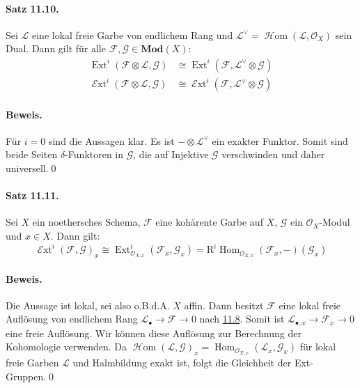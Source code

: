 \paragraph{Satz 11.10.}\label{11.10} Sei $\mathcal{L}$ eine lokal freie Garbe von endlichem Rang und $\mathcal{L}^\vee=\operatorname{\mathcal{H}om}(\mathcal{L},\mathcal{O}_X)$ sein Dual. Dann gilt für alle $\mathcal{F},\mathcal{G}\in\mathbf{Mod}(X)$:
\begin{align*}
\operatorname{Ext}^i(\mathcal{F}\otimes\mathcal{L},\mathcal{G}) &\cong \operatorname{Ext}^i(\mathcal{F},\mathcal{L}^\vee\otimes\mathcal{G})\\
\operatorname{\mathcal{E}xt}^i(\mathcal{F}\otimes\mathcal{L},\mathcal{G}) &\cong \operatorname{\mathcal{E}xt}^i(\mathcal{F},\mathcal{L}^\vee\otimes\mathcal{G})
\end{align*}

\paragraph{Beweis.} Für $i=0$ sind die Aussagen klar. Es ist $-\otimes\mathcal{L}^\vee$ ein exakter Funktor. Somit sind beide Seiten $\delta$-Funktoren in $\mathcal{G}$, die auf Injektive $\mathcal{G}$ verschwinden und daher universell.\qed

\paragraph{Satz 11.11.}\label{11.11} Sei $X$ ein noethersches Schema, $\mathcal{F}$ eine kohärente Garbe auf $X$, $\mathcal{G}$ ein  $\mathcal{O}_X$-Modul und $x\in X$. Dann gilt:
\[\operatorname{\mathcal{E}xt}^i(\mathcal{F},\mathcal{G})_x\cong \operatorname{Ext}^i_{\mathcal{O}_{X,x}}(\mathcal{F}_x,\mathcal{G}_x) = \mathrm{R}^i\operatorname{Hom}_{\mathcal{O}_{X,x}}(\mathcal{F}_x,-)(\mathcal{G}_x) \]

\paragraph{Beweis.} Die Aussage ist lokal, sei also o.B.d.A. $X$ affin. Dann besitzt $\mathcal{F}$ eine lokal freie Auflösung von endlichem Rang $\mathcal{L}_\bullet\to\mathcal{F}\to 0$ nach \hyperref[11.8]{11.8}. Somit ist $\mathcal{L}_{\bullet,x}\to\mathcal{F}_x\to 0$ eine freie Auflösung. Wir können diese Auflösung zur Berechnung der Kohomologie verwenden. Da $\operatorname{\mathcal{H}om}(\mathcal{L},\mathcal{G})_x=\operatorname{Hom}_{\mathcal{O}_{X,x}}(\mathcal{L}_x,\mathcal{G}_x)$ für lokal freie Garben $\mathcal{L}$ und Halmbildung exakt ist, folgt die Gleichheit der Ext-Gruppen.\qed

